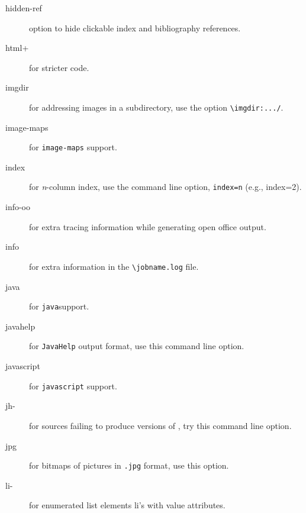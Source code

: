\documentclass[a4paper]{article}
\begin{document}
\begin{description}
\item[hidden-ref] option to hide clickable index and bibliography
  references.


\item[html+] for stricter \html code.


\item[imgdir] for addressing images in a subdirectory, use the option
  \verb=\imgdir:.../=.

\item[image-maps] for \verb=image-maps= support.

\item[index] for \emph{n}-column index, use the command line option,
  \verb+index=n+ (e.g., index=2).

\item[info-oo] for extra tracing information while generating open
  office output.

\item[info] for extra information in the \verb=\jobname.log= file.

\item[java] for \verb=java=support.

\item[javahelp] for \verb=JavaHelp= output format, use this command
  line option.

\item[javascript] for \verb=javascript= support.

\item[jh-] for sources failing to produce \xml versions of \html, try
  this command line option.


\item[jpg] for bitmaps of pictures in \verb=.jpg= format, use this
  option.

\item[li-] for enumerated list elements li's with value attributes.


\end{description}
\end{document}
